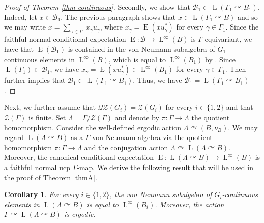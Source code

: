 \documentclass[JEP,XML,SOM,Unicode,published]{cedram}
\newtheorem{cor}[thm]{Corollary}
\theoremstyle{definition}
\DeclareMathOperator{\rE}{ E}
\DeclareMathOperator{\rL}{L}
\begin{document}
\begin{proof}[Proof of Theorem \ref{thm-continuous}]
Secondly, we show that $\mathscr B_1 \subset \rL(\Gamma_1 \curvearrowright B_1)$. Indeed, let $x \in \mathscr B_1$. The previous paragraph shows that $x \in \rL(\Gamma_1 \curvearrowright B)$ and so we may write $x = \sum_{\gamma \in \Gamma_1} x_\gamma u_\gamma$, where $x_\gamma = \rE(x u_\gamma^*)$ for every $\gamma \in \Gamma_1$. Since the faithful normal conditional expectation $\rE : \mathscr B \to \rL^\infty(B)$ is $\Gamma$-equivariant, we have that $\rE(\mathscr B_1)$ is contained in the von Neumann subalgebra of $G_1$-continuous elements in $\rL^\infty(B)$, which is equal to $\rL^\infty(B_1)$ by \cite[Lem.\,5.4]{BBHP20}. Since $\rL(\Gamma_1) \subset \mathscr B_1$, we have $x_\gamma = \rE(x u_\gamma^*) \in \rL^\infty(B_1)$ for every $\gamma \in \Gamma_1$. Then \cite[Cor.\,3.4]{Su18} further implies that $\mathscr B_1 \subset \rL(\Gamma_1 \curvearrowright B_1)$. Thus, we have $\mathscr B_1 = \rL(\Gamma_1 \curvearrowright B_1)$.
\end{proof}

Next, we further assume that $\mathscr{Q}\mathscr{Z}(G_i) = \mathscr Z(G_i)$ for every $i \in \{1, 2\}$ and that $\mathscr Z(\Gamma)$ is finite. Set $\Lambda = \Gamma/\mathscr Z(\Gamma)$ and denote by $\pi : \Gamma \to \Lambda$ the quotient homomorphism. Consider the well-defined ergodic action $\Lambda \curvearrowright (B, \nu_B)$. We may regard $\rL(\Lambda \curvearrowright B)$ as a $\Gamma$-von Neumann algebra via the quotient homomorphism $\pi : \Gamma \to \Lambda$ and the conjugation action $\Lambda \curvearrowright \rL(\Lambda \curvearrowright B)$. Moreover, the canonical conditional expectation $\rE : \rL(\Lambda \curvearrowright B) \to \rL^\infty(B)$ is a faithful normal ucp $\Gamma$-map. We derive the following result that will be used in the proof of Theorem \ref{thmA}.

\begin{cor}\label{cor-ergodic}
For every $i \in \{1, 2\}$, the von Neumann subalgebra of $G_i$-continuous elements in $\rL(\Lambda \curvearrowright B)$ is equal to $\rL^\infty(B_i)$. Moreover, the action $\Gamma \curvearrowright \rL(\Lambda \curvearrowright B)$ is ergodic.
\end{cor}
\end{document}
